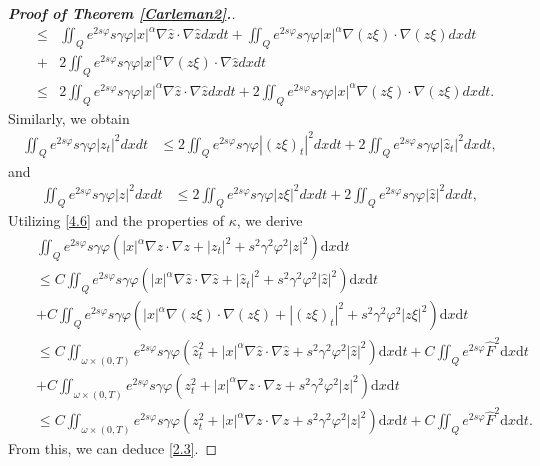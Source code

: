 \documentclass[11pt]{article}
\numberwithin{equation}{section}
\def\vp{\varphi}
\def\bf{\textbf}
\def\om{\omega}
\def\al{\alpha}
\def\ga{\gamma}
\def\ts{\times}
\def\df{\mathrm d}
\begin{document}
\begin{proof}[{\rm \bf { Proof of  Theorem \ref{Carleman2}.}}]
\begin{eqnarray*}
				&\le& \iint_Qe^{2s\vp}s\ga \vp |x|^\al \nabla \hat{z}\cdot \nabla \hat{z} dx dt + \iint_Qe^{2s\vp}s\ga \vp |x|^\al \nabla \left(z\xi \right) \cdot \nabla \left(z\xi \right) dx dt\\
				&+& 2 \iint_Qe^{2s\vp}s\ga \vp |x|^\al \nabla \left(z\xi \right) \cdot \nabla \hat{z} dx dt\\
				&\le& 2\iint_Qe^{2s\vp}s\ga \vp |x|^\al \nabla \hat{z}\cdot \nabla \hat{z} dx dt + 2\iint_Qe^{2s\vp}s\ga \vp |x|^\al \nabla \left(z\xi \right) \cdot \nabla \left(z\xi \right) dx dt.
			\end{eqnarray*}
			Similarly, we obtain
			\begin{equation*}
				\begin{split}
					\iint_Qe^{2s\vp}s\ga \vp |z_t|^2 dx dt
					&\le 2\iint_Qe^{2s\vp}s\ga \vp |(z \xi)_t | ^2 dx dt + 2\iint_Qe^{2s\vp}s\ga \vp |\hat{z}_t|^2  dx dt,
				\end{split}
			\end{equation*}
			and
			\begin{equation*}
				\begin{split}
					\iint_Qe^{2s\vp}s\ga \vp |z|^2 dx dt
					&\le 2\iint_Qe^{2s\vp}s\ga \vp |z\xi|^2 dx dt + 2\iint_Qe^{2s\vp}s\ga \vp |\hat{z}| ^2 dx dt,
				\end{split}
			\end{equation*}
			Utilizing \eqref{4.6} and the properties of  $\kappa$, we derive
			\begin{eqnarray*}
				&&\iint_Qe^{2s\vp}s\ga \vp \left(|x|^\al \nabla z\cdot \nabla z+|z_t|^2+s^2\ga^2\vp^2|z|^2\right)\df x\df t\\
				&&\le C\iint_Qe^{2s\vp}s\ga \vp \left(|x|^\al \nabla \hat{z}\cdot \nabla \hat{z}+|\hat{z}_t|^2+s^2\ga^2\vp^2|\hat{z}|^2\right)\df x\df t\\
				&&+
				C\iint_Qe^{2s\vp}s\ga \vp \left(|x|^\al \nabla (z \xi)\cdot \nabla (z \xi)+|(z \xi)_t|^2+s^2\ga^2\vp^2|z \xi|^2\right)\df x\df t\\
				&&\le
				C\iint_{\om\ts (0,T)}e^{2s\vp}s\ga \vp\left( \hat{z}_t^2+|x|^\al \nabla \hat{z}\cdot \nabla \hat{z} +s^2\ga^2\vp^2|\hat{z}|^2 \right)\df x\df t+C\iint_Qe^{2s\vp} \hat{F}^2\df x\df t\\
				&&+C\iint_{\om\ts (0,T)}e^{2s\vp}s\ga \vp\left( z_t^2+|x|^\al \nabla z\cdot \nabla z +s^2\ga^2\vp^2|z|^2 \right)\df x\df t\\
				&&\le C\iint_{\om\ts (0,T)}e^{2s\vp}s\ga \vp\left( z_t^2+|x|^\al \nabla z\cdot \nabla z +s^2\ga^2\vp^2|z|^2 \right)\df x\df t +C\iint_Qe^{2s\vp} \hat{F}^2\df x\df t.
			\end{eqnarray*}
			From this, we can deduce \eqref{2.3}. 		
		\end{proof}
		
\end{document}
